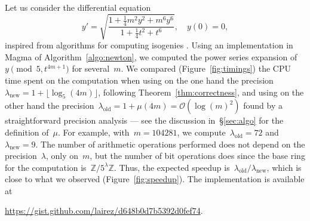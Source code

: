 \documentclass{sig-alternate}
\theoremstyle{definition}
\theoremstyle{remark}
\newcommand{\Z}{\mathbb{Z}}
\newcommand\cO{\mathcal{O}}
\begin{document}
Let us consider the differential equation
\begin{equation}
 y' = \sqrt{\frac{1 + \frac{1}{4} m^2 y^2 + m^6y^6}{1+\frac{1}{4}t^2 + t^6}}, \quad y(0)=0,  
  \label{eqn:deqiso}
\end{equation}
inspired from algorithms for computing isogenies
\parencite{Bostan:2008,LerSir08}.  Using an implementation in Magma \parencite{magma} of
Algorithm~\ref{algo:newton}, we computed the power series expansion of~$y
\pmod{5, t^{4m+1}}$ for several~$m$.  We compared (Figure~\ref{fig:timings}) the CPU time spent on the computation when using on
the one hand the precision~$\lambda_\text{new} = 1+\lfloor \log_5(4 m) \rfloor$,
following Theorem~\ref{thm:correctness}, and using on the other hand the
precision~$\lambda_\text{old} = 1+\mu(4m) = \cO( \log(m)^2 )$ found by a straightforward precision analysis --- see the discussion in~\S\ref{sec:algo} for the definition of~$\mu$.
For example, with~$m=104281$, we compute~$\lambda_\text{old}=72$ and~$\lambda_\text{new}=9$.
The number of arithmetic operations performed does not depend on the precision~$\lambda$, only on~$m$, but the number of bit operations does since the base ring for the computation is~$\Z/5^\lambda\Z$.
Thus, the expected speedup is~$\lambda_{\text{old}}/\lambda_\text{new}$, which is close to what we observed (Figure~\ref{fig:speedup}).
The implementation is available at
{\center\url{https://gist.github.com/lairez/d648b0d7b5392d0fef74}.

}





\printbibliography
\end{document}
